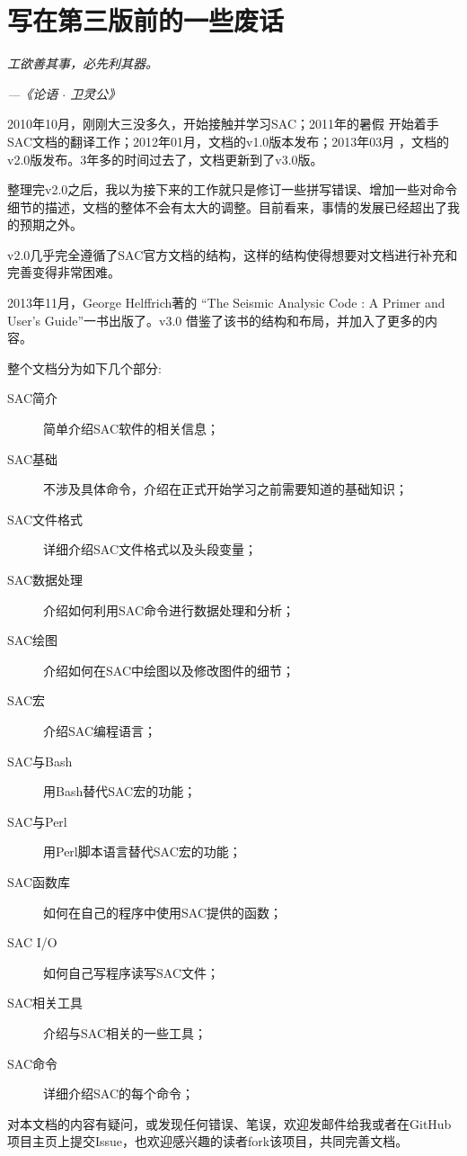 \section*{\centering 写在第三版前的一些废话}

\begin{shadequote*}
\Large\emph{
工欲善其事，必先利其器。
}
\par\hfill\emph{\normalsize---《论语 $\cdot$ 卫灵公》}
\end{shadequote*}

2010年10月，刚刚大三没多久，开始接触并学习SAC；2011年的暑假
开始着手SAC文档的翻译工作；2012年01月，文档的v1.0版本发布；2013年03月
，文档的v2.0版发布。3年多的时间过去了，文档更新到了v3.0版。

整理完v2.0之后，我以为接下来的工作就只是修订一些拼写错误、增加一些对命令
细节的描述，文档的整体不会有太大的调整。目前看来，事情的发展已经超出了我
的预期之外。

v2.0几乎完全遵循了SAC官方文档的结构，这样的结构使得想要对文档进行补充和
完善变得非常困难。

2013年11月，George Helffrich著的
``The Seismic Analysic Code : A Primer and User's Guide''一书出版了。v3.0
借鉴了该书的结构和布局，并加入了更多的内容。

整个文档分为如下几个部分:
\begin{description}
\item[SAC简介] 简单介绍SAC软件的相关信息；
\item[SAC基础] 不涉及具体命令，介绍在正式开始学习之前需要知道的基础知识；
\item[SAC文件格式] 详细介绍SAC文件格式以及头段变量；
\item[SAC数据处理] 介绍如何利用SAC命令进行数据处理和分析；
\item[SAC绘图] 介绍如何在SAC中绘图以及修改图件的细节；
\item[SAC宏] 介绍SAC编程语言；
\item[SAC与Bash] 用Bash替代SAC宏的功能；
\item[SAC与Perl] 用Perl脚本语言替代SAC宏的功能；
\item[SAC函数库] 如何在自己的程序中使用SAC提供的函数；
\item[SAC I/O] 如何自己写程序读写SAC文件；
\item[SAC相关工具] 介绍与SAC相关的一些工具；
\item[SAC命令] 详细介绍SAC的每个命令；
\end{description}

对本文档的内容有疑问，或发现任何错误、笔误，欢迎发邮件给我或者在GitHub
项目主页上提交Issue，也欢迎感兴趣的读者fork该项目，共同完善文档。

